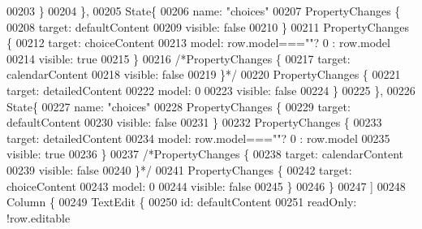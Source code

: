 \begin{DoxyCode}
00203                         \}
00204                     \},
00205                     State\{
00206                         name: \textcolor{stringliteral}{"choices"}
00207                         PropertyChanges \{
00208                             target: defaultContent
00209                             visible: \textcolor{keyword}{false}
00210                         \}
00211                         PropertyChanges \{
00212                             target: choiceContent
00213                             model: row.model===\textcolor{stringliteral}{""}? 0  : row.model
00214                             visible: \textcolor{keyword}{true}
00215                         \}
00216                         \textcolor{comment}{/*PropertyChanges \{}
00217 \textcolor{comment}{                            target: calendarContent}
00218 \textcolor{comment}{                            visible: false}
00219 \textcolor{comment}{                        \}*/}
00220                         PropertyChanges \{
00221                             target: detailedContent
00222                             model: 0
00223                             visible: \textcolor{keyword}{false}
00224                         \}
00225                     \},
00226                     State\{
00227                         name: \textcolor{stringliteral}{"choices"}
00228                         PropertyChanges \{
00229                             target: defaultContent
00230                             visible: \textcolor{keyword}{false}
00231                         \}
00232                         PropertyChanges \{
00233                             target: detailedContent
00234                             model: row.model===\textcolor{stringliteral}{""}? 0  : row.model
00235                             visible: \textcolor{keyword}{true}
00236                         \}
00237                         \textcolor{comment}{/*PropertyChanges \{}
00238 \textcolor{comment}{                            target: calendarContent}
00239 \textcolor{comment}{                            visible: false}
00240 \textcolor{comment}{                        \}*/}
00241                         PropertyChanges \{
00242                             target: choiceContent
00243                             model: 0
00244                             visible: \textcolor{keyword}{false}
00245                         \}
00246                     \}
00247                 ]
00248                 Column \{
00249                     TextEdit \{
00250                         \textcolor{keywordtype}{id}: defaultContent
00251                         readOnly:  !row.editable

\end{DoxyCode}
